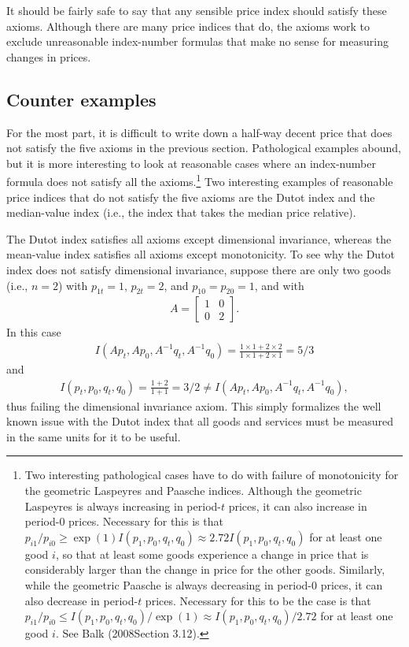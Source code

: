 \documentclass[
]{article}
\begin{document}
It should be fairly safe to say that any sensible price index should satisfy these axioms. Although there are many price indices that do, the axioms work to exclude unreasonable index-number formulas that make no sense for measuring changes in prices.

\hypertarget{counter-examples}{%
\subsection{Counter examples}\label{counter-examples}}

For the most part, it is difficult to write down a half-way decent price that does not satisfy the five axioms in the previous section. Pathological examples abound, but it is more interesting to look at reasonable cases where an index-number formula does not satisfy all the axioms.\footnote{Two interesting pathological cases have to do with failure of monotonicity for the geometric Laspeyres and Paasche indices. Although the geometric Laspeyres is always increasing in period-\(t\) prices, it can also increase in period-0 prices. Necessary for this is that \(p_{i1} / p_{i0} \geq \exp(1) I(p_{1}, p_{0}, q_{t}, q_{0}) \approx 2.72 I(p_{1}, p_{0}, q_{t}, q_{0})\) for at least one good \(i\), so that at least some goods experience a change in price that is considerably larger than the change in price for the other goods. Similarly, while the geometric Paasche is always decreasing in period-0 prices, it can also decrease in period-\(t\) prices. Necessary for this to be the case is that \(p_{i1} / p_{i0} \leq I(p_{1}, p_{0}, q_{t}, q_{0}) / \exp(1) \approx I(p_{1}, p_{0}, q_{t}, q_{0}) / 2.72\) for at least one good \(i\). See Balk (2008Section 3.12).} Two interesting examples of reasonable price indices that do not satisfy the five axioms are the Dutot index and the median-value index (i.e., the index that takes the median price relative).

The Dutot index satisfies all axioms except dimensional invariance, whereas the mean-value index satisfies all axioms except monotonicity. To see why the Dutot index does not satisfy dimensional invariance, suppose there are only two goods (i.e., \(n = 2\)) with \(p_{1t} = 1\), \(p_{2t} = 2\), and \(p_{10} = p_{20} = 1\), and with
\begin{align*}
A = 
\begin{bmatrix}
1 & 0 \\
0 & 2
\end{bmatrix}.
\end{align*}
In this case
\begin{align*}
I(Ap_{t}, Ap_{0}, A^{-1}q_{t}, A^{-1}q_{0}) = \frac{1 \times 1 + 2 \times 2}{1 \times 1 + 2 \times 1} = 5 / 3
\end{align*}
and
\begin{align*}
I(p_{t}, p_{0}, q_{t}, q_{0}) = \frac{1 + 2}{1 + 1} = 3 / 2 \neq I(Ap_{t}, Ap_{0}, A^{-1}q_{t}, A^{-1}q_{0}),
\end{align*}
thus failing the dimensional invariance axiom. This simply formalizes the well known issue with the Dutot index that all goods and services must be measured in the same units for it to be useful.
\end{document}
